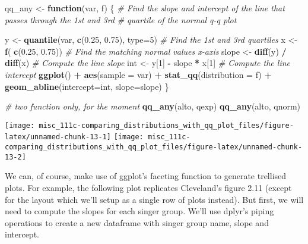 \documentclass[]{book}
\newenvironment{Shaded}{\begin{snugshade}}{\end{snugshade}}
\newcommand{\CommentTok}[1]{\textcolor[rgb]{0.56,0.35,0.01}{\textit{#1}}}
\newcommand{\ControlFlowTok}[1]{\textcolor[rgb]{0.13,0.29,0.53}{\textbf{#1}}}
\newcommand{\DataTypeTok}[1]{\textcolor[rgb]{0.13,0.29,0.53}{#1}}
\newcommand{\DecValTok}[1]{\textcolor[rgb]{0.00,0.00,0.81}{#1}}
\newcommand{\FloatTok}[1]{\textcolor[rgb]{0.00,0.00,0.81}{#1}}
\newcommand{\KeywordTok}[1]{\textcolor[rgb]{0.13,0.29,0.53}{\textbf{#1}}}
\newcommand{\NormalTok}[1]{#1}
\newcommand{\OperatorTok}[1]{\textcolor[rgb]{0.81,0.36,0.00}{\textbf{#1}}}
\newcommand{\StringTok}[1]{\textcolor[rgb]{0.31,0.60,0.02}{#1}}
\begin{document}
\begin{Shaded}
\begin{Highlighting}[]

\NormalTok{qq_any <-}\StringTok{ }\ControlFlowTok{function}\NormalTok{(var, f) \{}
    \CommentTok{# Find the slope and intercept of the line that passes through the 1st and 3rd}
    \CommentTok{# quartile of the normal q-q plot}
    
\NormalTok{    y     <-}\StringTok{ }\KeywordTok{quantile}\NormalTok{(var, }\KeywordTok{c}\NormalTok{(}\FloatTok{0.25}\NormalTok{, }\FloatTok{0.75}\NormalTok{), }\DataTypeTok{type=}\DecValTok{5}\NormalTok{) }\CommentTok{# Find the 1st and 3rd quartiles}
\NormalTok{    x     <-}\StringTok{ }\KeywordTok{f}\NormalTok{( }\KeywordTok{c}\NormalTok{(}\FloatTok{0.25}\NormalTok{, }\FloatTok{0.75}\NormalTok{))                 }\CommentTok{# Find the matching normal values x-axis}
\NormalTok{    slope <-}\StringTok{ }\KeywordTok{diff}\NormalTok{(y) }\OperatorTok{/}\StringTok{ }\KeywordTok{diff}\NormalTok{(x)                     }\CommentTok{# Compute the line slope}
\NormalTok{    int   <-}\StringTok{ }\NormalTok{y[}\DecValTok{1}\NormalTok{] }\OperatorTok{-}\StringTok{ }\NormalTok{slope }\OperatorTok{*}\StringTok{ }\NormalTok{x[}\DecValTok{1}\NormalTok{]                   }\CommentTok{# Compute the line intercept}
    \KeywordTok{ggplot}\NormalTok{() }\OperatorTok{+}\StringTok{ }\KeywordTok{aes}\NormalTok{(}\DataTypeTok{sample =}\NormalTok{ var) }\OperatorTok{+}\StringTok{ }
\StringTok{    }\KeywordTok{stat_qq}\NormalTok{(}\DataTypeTok{distribution =}\NormalTok{ f) }\OperatorTok{+}\StringTok{ }
\StringTok{    }\KeywordTok{geom_abline}\NormalTok{(}\DataTypeTok{intercept=}\NormalTok{int, }\DataTypeTok{slope=}\NormalTok{slope)}
\NormalTok{\}}

\CommentTok{# two function only, for the moment}
\KeywordTok{qq_any}\NormalTok{(alto, qexp)}
\KeywordTok{qq_any}\NormalTok{(alto, qnorm)}
\end{Highlighting}
\end{Shaded}

\begin{center}\texttt{[image: misc\_111c-comparing\_distributions\_with\_qq\_plot\_files/figure-latex/unnamed-chunk-13-1]} \texttt{[image: misc\_111c-comparing\_distributions\_with\_qq\_plot\_files/figure-latex/unnamed-chunk-13-2]} \end{center}

We can, of course, make use of ggplot's faceting function to generate trellised plots. For example, the following plot replicates Cleveland's figure 2.11 (except for the layout which we'll setup as a single row of plots instead). But first, we will need to compute the slopes for each singer group. We'll use dplyr's piping operations to create a new dataframe with singer group name, slope and intercept.
\end{document}
